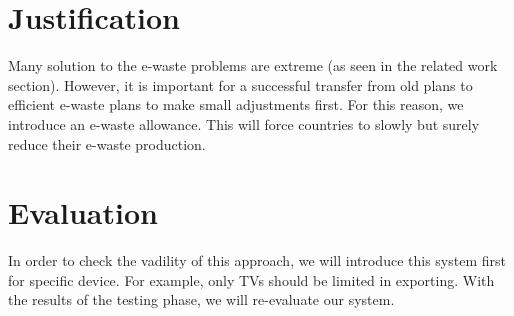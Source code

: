 \documentclass[sigchi-a, authorversion]{acmart}
\begin{document}
 











\section{Justification}

Many solution to the e-waste problems are extreme (as seen in the related work section). However, it is important
for a successful transfer from old plans to efficient e-waste plans to make small adjustments first. 
For this reason, we introduce an e-waste allowance. This will force countries to slowly but surely reduce their e-waste production.

\section{Evaluation}

In order to check the vadility of this approach, we will introduce this system first for specific device. 
For example, only TVs should be limited in exporting. With the results of the testing phase, we will 
re-evaluate our system.
\end{document}
